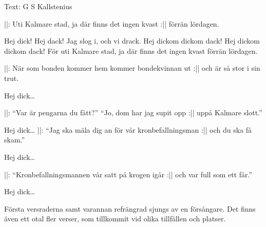 \begin{song}

\begin{songmeta}
Text: G S Kallstenius
\end{songmeta}

\begin{songtext}
||: Uti Kalmare stad,
ja där finns det ingen kvast :||
förrän lördagen.

Hej dick!
Hej dack!
Jag slog i,
och vi drack.
Hej dickom dickom dack!
Hej dickom dickom dack!
För uti Kalmare stad,
ja där finns det ingen kvast
förrän lördagen.

||: När som bonden kommer hem
kommer bondekvinnan ut :||
och är så stor i sin trut.

Hej dick\ldots

||: \textquotedblleft{}Var är pengarna du fått?\textquotedblright{}
\textquotedblleft{}Jo, dom har jag supit opp :||
uppå Kalmare slott.\textquotedblright{}

Hej dick\ldots
\newpage
\noindent||: \textquotedblleft{}Jag ska mäla dig an
för vår kronbefallningsman :||
och du ska få skam.\textquotedblright{}

Hej dick\ldots

||: \textquotedblleft{}Kronbefallningsmannen vår
satt på krogen igår :||
och var full som ett får.\textquotedblright{}

Hej dick\ldots
\end{songtext}

\begin{songnotes}
Första versraderna samt varannan refrängrad sjungs av en försångare.
Det finns även ett otal fler verser, som tillkommit vid olika tillfällen och platser.
\end{songnotes}

\end{song}
